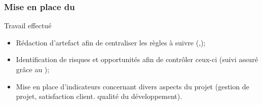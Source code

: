 \speaker{\Kafui}

\begin{frame}

\frametitle{Mise en place du \SMQ}
	\begin{block}{Travail effectué}
		\begin{itemize}
			\item Rédaction d'artefact afin de centraliser les règles à suivre (\PQ{},\PGC{});		
			\item Identification de risques et opportunités afin de contrôler ceux-ci (suivi assuré grâce au \PRO);
			\item Mise en place d'indicateurs concernant divers aspects du projet (gestion de projet, satisfaction client. qualité du développement).
		\end{itemize}      
	\end{block}
\end{frame}
